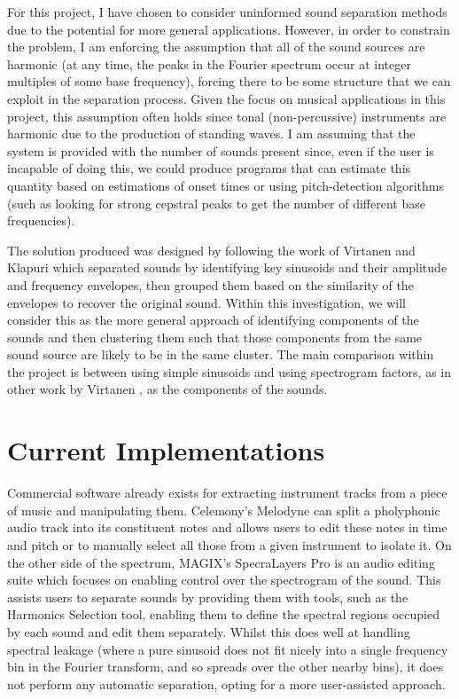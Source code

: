 \documentclass[10pt,twoside,a4paper]{report}
\begin{document}
For this project, I have chosen to consider uninformed sound separation methods due to the potential for more general applications. However, in order to constrain the problem, I am enforcing the assumption that all of the sound sources are harmonic (at any time, the peaks in the Fourier spectrum occur at integer multiples of some base frequency), forcing there to be some structure that we can exploit in the separation process. Given the focus on musical applications in this project, this assumption often holds since tonal (non-percussive) instruments are harmonic due to the production of standing waves. I am assuming that the system is provided with the number of sounds present since, even if the user is incapable of doing this, we could produce programs that can estimate this quantity based on estimations of onset times or using pitch-detection algorithms (such as looking for strong cepstral peaks to get the number of different base frequencies).

The solution produced was designed by following the work of Virtanen and Klapuri \cite{virtanen2000separation} which separated sounds by identifying key sinusoids and their amplitude and frequency envelopes, then grouped them based on the similarity of the envelopes to recover the original sound. Within this investigation, we will consider this as the more general approach of identifying components of the sounds and then clustering them such that those components from the same sound source are likely to be in the same cluster. The main comparison within the project is between using simple sinusoids and using spectrogram factors, as in other work by Virtanen \cite{virtanen2003sound}, as the components of the sounds.

\section{Current Implementations}

Commercial software already exists for extracting instrument tracks from a piece of music and manipulating them. Celemony's Melodyne \cite{melodyne} can split a pholyphonic audio track into its constituent notes and allows users to edit these notes in time and pitch or to manually select all those from a given instrument to isolate it. On the other side of the spectrum, MAGIX's SpecraLayers Pro \cite{spatralayers} is an audio editing suite which focuses on enabling control over the spectrogram of the sound. This assists users to separate sounds by providing them with tools, such as the Harmonics Selection tool, enabling them to define the spectral regions occupied by each sound and edit them separately. Whilst this does well at handling spectral leakage (where a pure sinusoid does not fit nicely into a single frequency bin in the Fourier transform, and so spreads over the other nearby bins), it does not perform any automatic separation, opting for a more user-assisted approach.
\end{document}
